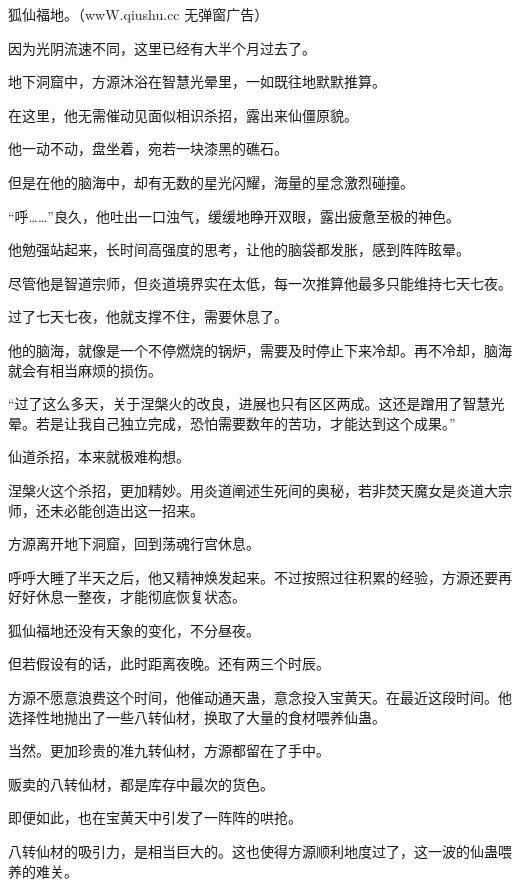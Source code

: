 
\begin{this_body}

狐仙福地。（wwW.qiushu.cc 无弹窗广告）

因为光阴流速不同，这里已经有大半个月过去了。

地下洞窟中，方源沐浴在智慧光晕里，一如既往地默默推算。

在这里，他无需催动见面似相识杀招，露出来仙僵原貌。

他一动不动，盘坐着，宛若一块漆黑的礁石。

但是在他的脑海中，却有无数的星光闪耀，海量的星念激烈碰撞。

“呼……”良久，他吐出一口浊气，缓缓地睁开双眼，露出疲惫至极的神色。

他勉强站起来，长时间高强度的思考，让他的脑袋都发胀，感到阵阵眩晕。

尽管他是智道宗师，但炎道境界实在太低，每一次推算他最多只能维持七天七夜。

过了七天七夜，他就支撑不住，需要休息了。

他的脑海，就像是一个不停燃烧的锅炉，需要及时停止下来冷却。再不冷却，脑海就会有相当麻烦的损伤。

“过了这么多天，关于涅槃火的改良，进展也只有区区两成。这还是蹭用了智慧光晕。若是让我自己独立完成，恐怕需要数年的苦功，才能达到这个成果。”

仙道杀招，本来就极难构想。

涅槃火这个杀招，更加精妙。用炎道阐述生死间的奥秘，若非焚天魔女是炎道大宗师，还未必能创造出这一招来。

方源离开地下洞窟，回到荡魂行宫休息。

呼呼大睡了半天之后，他又精神焕发起来。不过按照过往积累的经验，方源还要再好好休息一整夜，才能彻底恢复状态。

狐仙福地还没有天象的变化，不分昼夜。

但若假设有的话，此时距离夜晚。还有两三个时辰。

方源不愿意浪费这个时间，他催动通天蛊，意念投入宝黄天。在最近这段时间。他选择性地抛出了一些八转仙材，换取了大量的食材喂养仙蛊。

当然。更加珍贵的准九转仙材，方源都留在了手中。

贩卖的八转仙材，都是库存中最次的货色。

即便如此，也在宝黄天中引发了一阵阵的哄抢。

八转仙材的吸引力，是相当巨大的。这也使得方源顺利地度过了，这一波的仙蛊喂养的难关。


\end{this_body}

